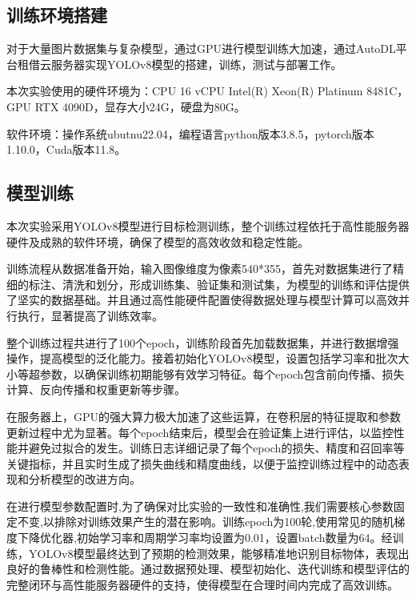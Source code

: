 \documentclass[journal]{IEEEtran}
\numberwithin{figure}{section}%
\numberwithin{table}{section}%
\numberwithin{equation}{section}
\begin{document}
\subsection{训练环境搭建}
对于大量图片数据集与复杂模型，通过GPU进行模型训练大加速，通过AutoDL平台租借云服务器实现YOLOv8模型的搭建，训练，测试与部署工作。\par
本次实验使用的硬件环境为：CPU 16 vCPU Intel(R) Xeon(R) Platinum 8481C，GPU RTX 4090D，显存大小24G，硬盘为80G。\par
软件环境：操作系统ubutnu22.04，编程语言python版本3.8.5，pytorch版本1.10.0，Cuda版本11.8。\par

\subsection{模型训练}
本次实验采用YOLOv8模型进行目标检测训练，整个训练过程依托于高性能服务器硬件及成熟的软件环境，确保了模型的高效收敛和稳定性能。\par
训练流程从数据准备开始，输入图像维度为像素540*355，首先对数据集进行了精细的标注、清洗和划分，形成训练集、验证集和测试集，为模型的训练和评估提供了坚实的数据基础。并且通过高性能硬件配置使得数据处理与模型计算可以高效并行执行，显著提高了训练效率。\par
整个训练过程共进行了100个epoch，训练阶段首先加载数据集，并进行数据增强操作，提高模型的泛化能力。接着初始化YOLOv8模型，设置包括学习率和批次大小等超参数，以确保训练初期能够有效学习特征。每个epoch包含前向传播、损失计算、反向传播和权重更新等步骤。\par
在服务器上，GPU的强大算力极大加速了这些运算，在卷积层的特征提取和参数更新过程中尤为显著。每个epoch结束后，模型会在验证集上进行评估，以监控性能并避免过拟合的发生。训练日志详细记录了每个epoch的损失、精度和召回率等关键指标，并且实时生成了损失曲线和精度曲线，以便于监控训练过程中的动态表现和分析模型的改进方向。\par
在进行模型参数配置时,为了确保对比实验的一致性和准确性,我们需要核心参数固定不变,以排除对训练效果产生的潜在影响。训练epoch为100轮,使用常见的随机梯度下降优化器,初始学习率和周期学习率均设置为0.01，设置batch数量为64。经训练，YOLOv8模型最终达到了预期的检测效果，能够精准地识别目标物体，表现出良好的鲁棒性和检测性能。通过数据预处理、模型初始化、迭代训练和模型评估的完整闭环与高性能服务器硬件的支持，使得模型在合理时间内完成了高效训练。\par

\end{document}
